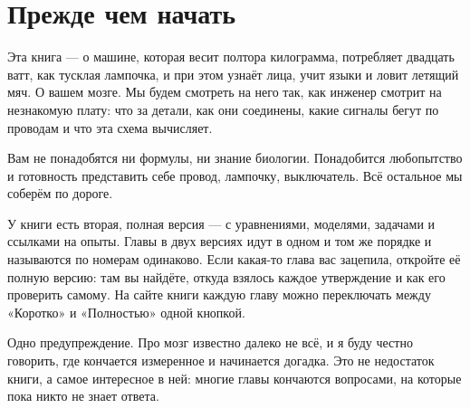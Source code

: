 \chapter*{Прежде чем начать}

Эта книга --- о машине, которая весит полтора килограмма, потребляет двадцать ватт, как тусклая лампочка, и при этом узнаёт лица, учит языки и ловит летящий мяч. О вашем мозге. Мы будем смотреть на него так, как инженер смотрит на незнакомую плату: что за детали, как они соединены, какие сигналы бегут по проводам и что эта схема вычисляет.

Вам не понадобятся ни формулы, ни знание биологии. Понадобится любопытство и готовность представить себе провод, лампочку, выключатель. Всё остальное мы соберём по дороге.

У книги есть вторая, полная версия --- с уравнениями, моделями, задачами и ссылками на опыты. Главы в двух версиях идут в одном и том же порядке и называются по номерам одинаково. Если какая-то глава вас зацепила, откройте её полную версию: там вы найдёте, откуда взялось каждое утверждение и как его проверить самому. На сайте книги каждую главу можно переключать между «Коротко» и «Полностью» одной кнопкой.

Одно предупреждение. Про мозг известно далеко не всё, и я буду честно говорить, где кончается измеренное и начинается догадка. Это не недостаток книги, а самое интересное в ней: многие главы кончаются вопросами, на которые пока никто не знает ответа.
